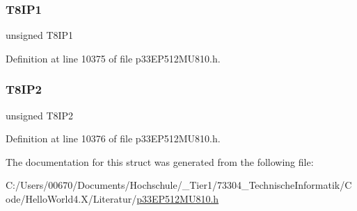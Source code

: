 \mbox{\label{structtag_i_p_c12_b_i_t_s_a1489d22a3008113ba4ba5399b8efd895}} 
\subsubsection{\texorpdfstring{T8\+I\+P1}{T8IP1}}
{\footnotesize\ttfamily unsigned T8\+I\+P1}



Definition at line 10375 of file p33\+E\+P512\+M\+U810.\+h.

\mbox{\label{structtag_i_p_c12_b_i_t_s_a969f225d4dd19d6e2dfc06f3d57c2f61}} 
\subsubsection{\texorpdfstring{T8\+I\+P2}{T8IP2}}
{\footnotesize\ttfamily unsigned T8\+I\+P2}



Definition at line 10376 of file p33\+E\+P512\+M\+U810.\+h.



The documentation for this struct was generated from the following file\+:\begin{DoxyCompactItemize}
\item 
C\+:/\+Users/00670/\+Documents/\+Hochschule/\+\_\+\+Tier1/73304\+\_\+\+Technische\+Informatik/\+Code/\+Hello\+World4.\+X/\+Literatur/\hyperlink{p33_e_p512_m_u810_8h}{p33\+E\+P512\+M\+U810.\+h}\end{DoxyCompactItemize}
